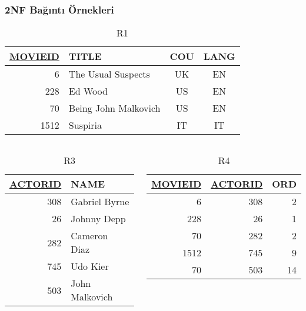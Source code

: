 \documentclass[dvipsnames]{beamer}
\theoremstyle{theorem}
\begin{document}
\begin{frame}
\label{example_db_2}
  \frametitle{2NF Bağıntı Örnekleri}

\vspace{-12pt}
  \begin{center}
    \begin{footnotesize}
    \begin{table}
      \caption{R1}
      \begin{tabular}{|r|l|c|c|}\hline
\underline{MOVIEID} & TITLE    & COU & LANG\\[2pt]\hline\hline
      6 & The Usual Suspects   & UK  &  EN \\\hline
    228 & Ed Wood              & US  &  EN \\\hline
     70 & Being John Malkovich & US  &  EN \\\hline
   1512 & Suspiria             & IT  &  IT \\\hline
      \end{tabular}
    \end{table}
    \end{footnotesize}
  \end{center}

  \vspace{-12pt}
  \begin{columns}[t]
    \begin{footnotesize}
    \begin{table}
      \caption{R3}
      \begin{tabular}{|r|l|}\hline
\underline{ACTORID} & NAME\\[2pt]\hline\hline
     308 & Gabriel Byrne \\\hline
      26 & Johnny Depp   \\\hline
     282 & Cameron Diaz  \\\hline
     745 & Udo Kier      \\\hline
     503 & John Malkovich\\\hline
      \end{tabular}
    \end{table}
    \end{footnotesize}

    \begin{footnotesize}
    \begin{table}
      \caption{R4}
      \begin{tabular}{|r|r|r|}\hline
\underline{MOVIEID} & \underline{ACTORID} & ORD\\[2pt]\hline\hline
   6 & 308 &  2\\\hline
 228 &  26 &  1\\\hline
  70 & 282 &  2\\\hline
1512 & 745 &  9\\\hline
  70 & 503 & 14\\\hline
      \end{tabular}
    \end{table}
    \end{footnotesize}
  \end{columns}
\end{frame}
\end{document}
